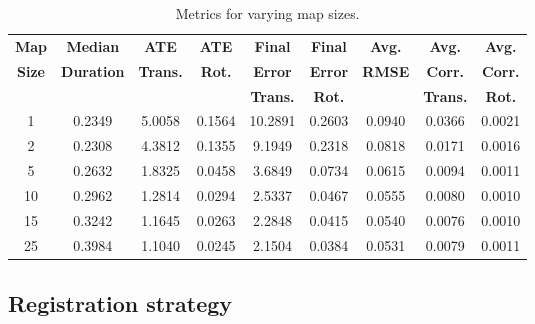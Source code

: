\begin{table}[h]
    \centering
    \begin{tabular}{c|cccccccc}
        \hline
        \textbf{Map}  & \textbf{Median}   & \textbf{ATE}    & \textbf{ATE}  & \textbf{Final } & \textbf{Final} & \textbf{Avg.} & \textbf{Avg.}   & \textbf{Avg.}  \\
        \textbf{Size} & \textbf{Duration} & \textbf{Trans.} & \textbf{Rot.} & \textbf{Error}  & \textbf{Error} & \textbf{RMSE} & \textbf{Corr.}  & \textbf{Corr.} \\
                      &                   & \textbf{}       & \textbf{}     & \textbf{Trans.} & \textbf{Rot.}  & \textbf{}     & \textbf{Trans.} & \textbf{Rot.}  \\
        \hline \hline
        1             & 0.2349            & 5.0058          & 0.1564        & 10.2891         & 0.2603         & 0.0940        & 0.0366          & 0.0021         \\
        2             & 0.2308            & 4.3812          & 0.1355        & 9.1949          & 0.2318         & 0.0818        & 0.0171          & 0.0016         \\
        5             & 0.2632            & 1.8325          & 0.0458        & 3.6849          & 0.0734         & 0.0615        & 0.0094          & 0.0011         \\
        10            & 0.2962            & 1.2814          & 0.0294        & 2.5337          & 0.0467         & 0.0555        & 0.0080          & 0.0010         \\
        15            & 0.3242            & 1.1645          & 0.0263        & 2.2848          & 0.0415         & 0.0540        & 0.0076          & 0.0010         \\
        25            & 0.3984            & 1.1040          & 0.0245        & 2.1504          & 0.0384         & 0.0531        & 0.0079          & 0.0011         \\
        \hline
    \end{tabular}
    \caption{Metrics for varying map sizes.}
    \label{tab:map_sizes}
\end{table}

\subsection{Registration strategy}

